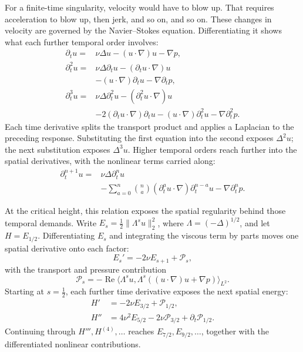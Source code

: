 For a finite-time singularity, velocity would have to blow up. That requires
acceleration to blow up, then jerk, and so on, and so on. These changes in
velocity are governed by the Navier--Stokes equation. Differentiating it
shows what each further temporal order involves:
\[
 \begin{aligned}
 \partial_tu={}&\nu\Delta u-(u\cdot\nabla)u-\nabla p,\\
 \partial_t^2u={}&\nu\Delta\partial_tu
 -(\partial_tu\cdot\nabla)u\\
 &-(u\cdot\nabla)\partial_tu-\nabla\partial_tp,\\
 \partial_t^3u={}&\nu\Delta\partial_t^2u
 -(\partial_t^2u\cdot\nabla)u\\
 &-2(\partial_tu\cdot\nabla)\partial_tu
 -(u\cdot\nabla)\partial_t^2u
 -\nabla\partial_t^2p.
 \end{aligned}
\]
Each time derivative splits the transport product and applies a Laplacian
to the preceding response. Substituting the first equation into the second
exposes \(\Delta^2u\); the next substitution exposes \(\Delta^3u\).
Higher temporal orders reach further into the spatial derivatives, with
the nonlinear terms carried along:
\[
 \begin{aligned}
 \partial_t^{n+1}u={}&\nu\Delta\partial_t^nu\\
 &-\sum_{a=0}^{n}\binom na
 (\partial_t^au\cdot\nabla)\partial_t^{n-a}u
 -\nabla\partial_t^np.
 \end{aligned}
\]

At the critical height, this relation exposes the spatial regularity
behind those temporal demands. Write
\(E_s=\tfrac12\|\Lambda^su\|_2^2\), where
\(\Lambda=(-\Delta)^{1/2}\), and let \(H=E_{1/2}\).
Differentiating \(E_s\) and integrating the viscous term by parts moves
one spatial derivative onto each factor:
\[
 E_s'=-2\nu E_{s+1}+\mathcal P_s,
\]
with the transport and pressure contribution
\[
 \mathcal P_s=-\operatorname{Re}\langle\Lambda^su,
 \Lambda^s((u\cdot\nabla)u+\nabla p)\rangle_{L^2}.
\]
Starting at \(s=\tfrac12\), each further time derivative exposes the next
spatial energy:
\[
 \begin{aligned}
 H'&=-2\nu E_{3/2}+\mathcal P_{1/2},\\
 H''&=4\nu^2E_{5/2}-2\nu\mathcal P_{3/2}
        +\partial_t\mathcal P_{1/2}.
 \end{aligned}
\]
Continuing through \(H''',H^{(4)},\ldots\) reaches
\(E_{7/2},E_{9/2},\ldots\), together with the differentiated nonlinear
contributions.

